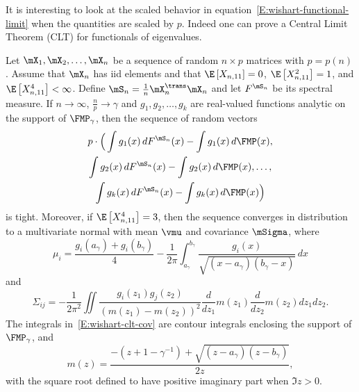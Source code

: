 It is interesting to look at the scaled behavior in equation~\eqref{E:wishart-functional-limit} when the quantities are scaled by $p$.  Indeed one can prove a Central Limit Theorem (CLT) for functionals of eigenvalues.

\begin{theorem}\label{T:wishart-clt}
    Let $\mX_1, \mX_2, \ldots, \mX_n$ be a sequence of random $n\times p$ 
    matrices with $p = p(n)$.  Assume that $\mX_n$ has iid elements and that 
    $\E\left[ X_{n,11} \right] = 0$, $\E\left[ X_{n,11}^2 \right] = 1$,
    and $\E\left[ X_{n,11}^4 \right] < \infty$.  
    Define $\mS_n = \frac{1}{n} \mX_n^\trans \mX_n$ and let $F^{\mS_n}$ be its 
    spectral measure.  If $n \to \infty$, $\frac{n}{p} \to \gamma$ and $g_1, 
    g_2, \ldots, g_k$ 
    are real-valued functions analytic on the support of $\FMP_\gamma$, then 
    the sequence of random vectors
    \begin{multline*}
        p
        \cdot
        \Big(
	    \int g_1(x) \, dF^{\mS_n}(x)
	    -
            \int g_1(x) \, d\FMP(x), \\
	    \int g_2(x) \, dF^{\mS_n}(x)
	    -
	    \int g_2(x) \, d\FMP(x),
	    \ldots, \\
            \int g_k(x) \, dF^{\mS_n}(x)
	    -
            \int g_k(x) \, d\FMP(x)
	\Big)
    \end{multline*}
    is tight.
    Moreover, if $\E \left[ X_{n,11}^4 \right] = 3$, then the sequence 
    converges in distribution to a multivariate normal with mean $\vmu$ and 
    covariance $\mSigma$, where 
    \begin{equation}\label{E:wishart-clt-mean}
        \mu_i
	    =
	    \frac{ g_i(a_\gamma) + g_i(b_\gamma) }
                 { 4 }
	    -
            \frac{1}{2 \pi}
	    \int_{a_\gamma}^{b_\gamma}
	        \frac{ g_i(x) }
	             { \sqrt{(x-a_\gamma)(b_\gamma-x)} }
                \,
                dx
    \end{equation}
    and
    \begin{equation}\label{E:wishart-clt-cov}
    	\Sigma_{ij}
    	=
    	-
    	\frac{1}{2 \pi^2}
    	\iint
    	    \frac{g_i(z_1) g_j(z_2)}
    	         {\left( m(z_1) - m(z_2) \right)^2}
    	    \frac{d}{dz_1} m(z_1)
    	    \frac{d}{dz_2} m(z_2)
    	    dz_1 dz_2.
    \end{equation}
    The integrals in~\eqref{E:wishart-clt-cov} are contour integrals enclosing the 
    support of $\FMP_\gamma$, and
    \begin{equation}
        m(z)
        =
	    \frac{-(z + 1 - \gamma^{-1}) + \sqrt{(z-a_\gamma)(z-b_\gamma)}}{2 z},
    \end{equation}
    with the square root defined to have positive imaginary part when
    $\Im z > 0$.
\end{theorem}

